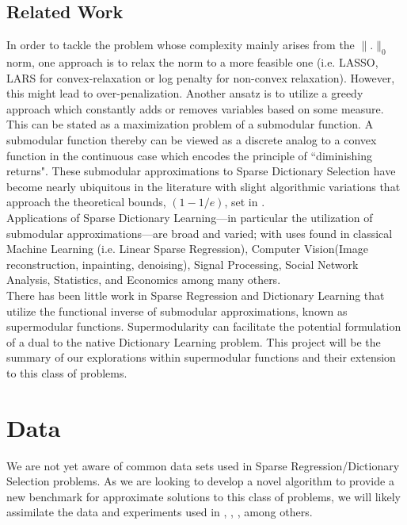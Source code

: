 \documentclass{article}
\begin{document}
\subsection{Related Work}
In order to tackle the problem whose complexity mainly arises from the $\| .\|_0$ norm, one approach is to relax the norm to a more feasible one (i.e. LASSO, LARS for convex-relaxation or log penalty for non-convex relaxation). However, this might lead to over-penalization\cite{nonconvexrelax}. Another ansatz is to utilize a greedy approach which constantly adds or removes variables based on some measure\cite{submod_spectral}.  This can be stated as a maximization problem of a submodular function. A submodular function thereby can be viewed as a discrete analog to a convex function in the continuous case\cite{submod_sparsecoding} which encodes the principle of ``diminishing returns". These submodular approximations to Sparse Dictionary Selection have become nearly ubiquitous in the literature with slight algorithmic variations that approach the theoretical bounds, $(1 - 1/e)$, set in \cite{Krause05near-optimalnonmyopic}.
\\

\noindent Applications of Sparse Dictionary Learning---in particular the utilization of submodular approximations---are broad and varied; with uses found in classical Machine Learning (i.e. Linear Sparse Regression), Computer Vision(Image reconstruction, inpainting, denoising), Signal Processing\cite{nonconvexrelax}\cite{submod_sparsecoding}, Social Network Analysis, Statistics\cite{rIBP}, and Economics\cite{utilityWelfare} among many others. 
\\

\noindent There has been little work in Sparse Regression and Dictionary Learning that utilize the functional inverse of submodular approximations, known as supermodular functions. Supermodularity can facilitate the potential formulation of a dual to the native Dictionary Learning problem. This project will be the summary of our explorations within supermodular functions and their extension to this class of problems.

\section{Data}
We are not yet aware of common data sets used in Sparse Regression/Dictionary Selection problems. As we are looking to develop a novel algorithm to provide a new benchmark for approximate solutions to this class of problems, we will likely assimilate the data and experiments used in  \cite{submod_spectral}, \cite{greedy_selection}, \cite{rIBP}, among others. 
\end{document}
